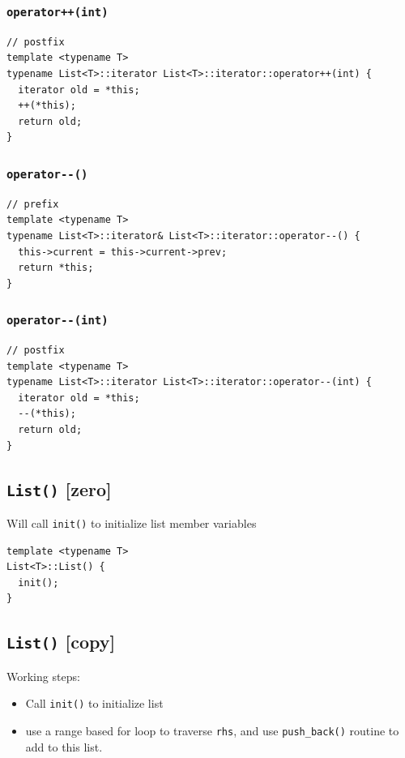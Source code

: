 \documentclass[11pt]{book}
\begin{document}
\subsubsection{\texttt{operator++(int)}}
\label{sec:org8d662f1}
\begin{verbatim}
// postfix
template <typename T>
typename List<T>::iterator List<T>::iterator::operator++(int) {
  iterator old = *this;
  ++(*this);
  return old;
}
\end{verbatim}
\subsubsection{\texttt{operator-{}-()}}
\label{sec:org8a5a49a}
\begin{verbatim}
// prefix
template <typename T>
typename List<T>::iterator& List<T>::iterator::operator--() {
  this->current = this->current->prev;
  return *this;
}
\end{verbatim}
\subsubsection{\texttt{operator-{}-(int)}}
\label{sec:org106b41b}
\begin{verbatim}
// postfix
template <typename T>
typename List<T>::iterator List<T>::iterator::operator--(int) {
  iterator old = *this;
  --(*this);
  return old;
}
\end{verbatim}
\subsection{\texttt{List()}  [zero]}
\label{sec:orgb8c0222}
Will call \texttt{init()} to initialize list member variables
\begin{verbatim}
template <typename T>
List<T>::List() {
  init();
}
\end{verbatim}
\subsection{\texttt{List()} [copy]}
\label{sec:org23b5f8b}
Working steps:
\begin{itemize}
\item Call \texttt{init()} to initialize list
\item use a range based for loop to traverse \texttt{rhs}, and use \texttt{push\_back()} routine to add to this list.
\end{itemize}
\end{document}
